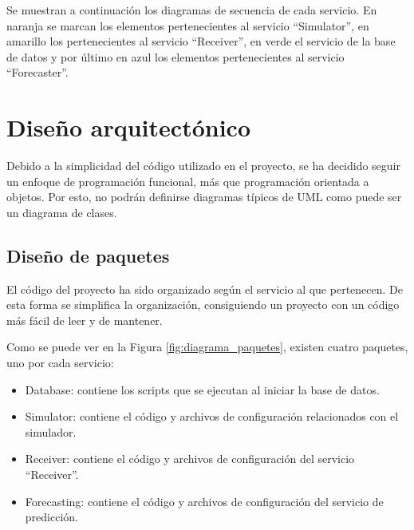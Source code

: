 Se muestran a continuación los diagramas de secuencia de cada servicio. En naranja se marcan los elementos
pertenecientes al servicio ``Simulator'', en amarillo los pertenecientes al servicio ``Receiver'', en verde 
el servicio de la base de datos y por último en azul los elementos pertenecientes al servicio ``Forecaster''.



\section{Diseño arquitectónico}

Debido a la simplicidad del código utilizado en el proyecto, se ha decidido seguir un enfoque de programación 
funcional, más que programación orientada a objetos. Por esto, no podrán definirse diagramas típicos de UML como 
puede ser un diagrama de clases.

\subsection{Diseño de paquetes}

El código del proyecto ha sido organizado según el servicio al que pertenecen. De esta forma se simplifica la organización,
consiguiendo un proyecto con un código más fácil de leer y de mantener.


Como se puede ver en la Figura \ref{fig:diagrama_paquetes}, existen cuatro paquetes, uno por cada servicio:
\begin{itemize}
    \item Database: contiene los scripts que se ejecutan al iniciar la base de datos.
    \item Simulator: contiene el código y archivos de configuración relacionados con el simulador.
    \item Receiver: contiene el código y archivos de configuración del servicio ``Receiver''.
    \item Forecasting: contiene el código y archivos de configuración del servicio de predicción.
\end{itemize}

